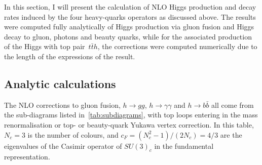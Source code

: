 \par In this section, I will present the calculation of NLO Higgs production and decay rates induced by the four heavy-quarks operators as discussed above. The results were computed fully analytically of Higgs production via gluon fusion and Higgs decay to gluon, photons and beauty quarks, while for the associated production of the Higgs with top pair~$ t\bar{t} h$, the corrections were computed numerically due to the length of the expressions of the result.

\subsection{Analytic calculations}
\par The NLO corrections to gluon fusion, $h \to gg$, $h\to \gamma \gamma$ and $ h \to b \bar{b}$ all come from the sub-diagrams listed in~\autoref{tab:subdiagrams}, with top loops entering in the mass renormalisation or top- or beauty-quark Yukawa vertex correction. In this table,  $N_c=3$ is the number of colours, and $c_F=(N_c^2-1)/(2N_c)=4/3$ are the eigenvalues of the Casimir operator of $SU(3)_c$ in the fundamental representation. 
